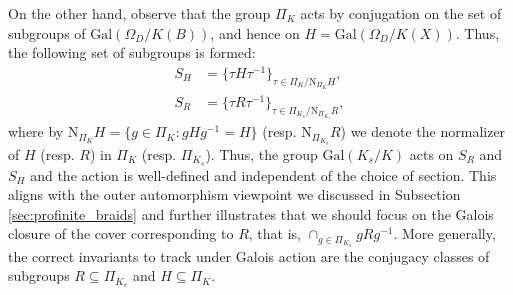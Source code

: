 \documentclass[10pt]{amsart}
\theoremstyle{definition}
\newcommand{\Gal}{{ \mathrm{Gal}}}
\begin{document}
On the other hand, observe that the group $\Pi_K$ acts by conjugation on the set of subgroups of $\Gal(\Omega_D/K(B))$, and hence on $H  = \Gal(\Omega_D / K(X))$. Thus, the following set of subgroups is formed:
\begin{align*}
 S_H &= \{ \tau H \tau^{-1} \}_{\tau \in   \Pi_{K}/ \mathrm{N}_{\Pi_{K}}H},\\  
 S_R &= \{ \tau R \tau^{-1} \}_{\tau \in \Pi_{K_s}/ \mathrm{N}_{\Pi_{K_s}}R},
\end{align*}
where by $\mathrm{N}_{\Pi_{K}}H = \{g \in \Pi_{K} : gHg^{-1} = H \}$ (resp. $\mathrm{N}_{\Pi_{K_s}}R$) we denote the normalizer of $H$ (resp. $R$) in $\Pi_{K}$ (resp. $\Pi_{K_s}$). Thus, the group $\Gal(K_s/K)$ acts on $S_R$ and $S_H$ and the action is well-defined and independent of the choice of section. This aligns with the outer automorphism viewpoint we discussed in Subsection \ref{sec:profinite_braids}
and further illustrates that we should focus on the Galois closure of the cover corresponding to $R$, that is, $\cap_{g \in \Pi_{K_s}} gRg^{-1}$. More generally, the correct invariants to track under Galois action are the conjugacy classes of subgroups
$R \subseteq \Pi_{K_s}$ and $ H \subseteq \Pi_{K}$.
\end{document}
